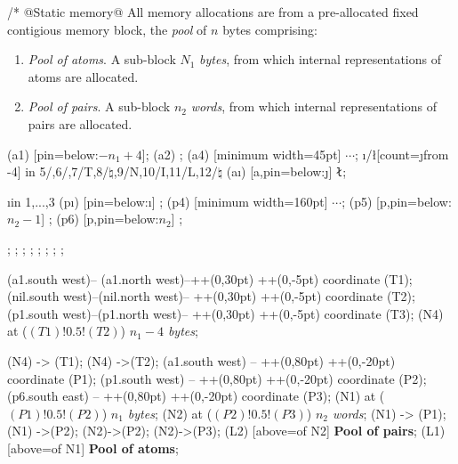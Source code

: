 \documentclass[12pt]{article}
\newenvironment{layout}{\quote\tikzpicture[start chain=going right,x=13pt,y=13pt]\scriptsize}
                       {\endtikzpicture\endquote}
\begin{document}
\begin{code}[literate=
    {*}{$\times$}{1}
    {=}{$\equiv$ }{1}{*}{$\times$}{1}
    {1<<13}{$2^{13}$}{3}
    {1<<15}{$2^{15}$}{3}
    {1a<<$H_x$}{$2^{H_x}$}{3}
]/* @Static memory@ 
All memory allocations are from a pre-allocated fixed 
contigious memory block, the \emph{pool} of $n$ bytes comprising:
\begin{enumerate} 
\item \emph{Pool of atoms}. A sub-block $N_1$ \emph{bytes}, from which 
internal representations of atoms are allocated. 
\item \emph{Pool of pairs}. A sub-block $n_2$ \emph{words},
from which internal representations of pairs are allocated. 
\end{enumerate}

\begin{layout}
\node[a] (a1) [pin=below:$-n_1+4$]{};
\node[a] (a2) {};
\node[a] (a4) [minimum width=45pt] {$\cdots$};
\foreach \i/\l[count=\j from -4] in {5/,6/,7/T,8/$\natural$,9/N,10/I,11/L,12/$\natural$} \node (a\i) [a,pin=below:{\j}] {\tt\l};

\foreach \i in {1,...,3} \node[p] (p\i) [pin=below:{\i}] {};
\node[p] (p4) [minimum width=160pt] {$\cdots$};
\node[p] (p5) [p,pin=below:{$n_2-1$}] {};
\node[p] (p6) [p,pin=below:{$n_2$}] {};

;
;
\node[p,draw,fill=olive!30,above=of p1,pin=above:1] {};
\node[p,draw,fill=olive!30,above=of p2,pin=above:2] {};
\node[p,draw,fill=olive!30,above=of p3,pin=above:2] {};
\node[p,draw,fill=olive!30,above=of p4,minimum width=160pt] {};
\node[p,draw,fill=olive!30,above=of p5,pin=above:$n_2-1$] {};
\node[p,draw,fill=olive!30,above=of p6,pin=above:$n_2$] {};

 (a1.south west)-- (a1.north west)--++(0,30pt) ++(0,-5pt) coordinate (T1);
 (nil.south west)--(nil.north west)-- ++(0,30pt) ++(0,-5pt) coordinate (T2);
 (p1.south west)--(p1.north west)-- ++(0,30pt) ++(0,-5pt) coordinate (T3);
\node (N4) at ($(T1)!0.5!(T2)$) {\it$n_1-4$ bytes};

\draw[m] (N4) -> (T1);
\draw[m] (N4) ->(T2);
 (a1.south west) -- ++(0,80pt) ++(0,-20pt) coordinate (P1);
 (p1.south west) -- ++(0,80pt) ++(0,-20pt) coordinate (P2);
 (p6.south east) -- ++(0,80pt) ++(0,-20pt) coordinate (P3);
\node (N1) at ($(P1)!0.5!(P2)$) {\it$n_1$ bytes};
\node (N2) at ($(P2)!0.5!(P3)$) {\it$n_2$ words};
\draw[m] (N1) -> (P1);
\draw[m] (N1) ->(P2);
\draw[m] (N2)->(P2);
\draw[m] (N2)->(P3); 
\node(L2) [above=of N2]  {\bf Pool of pairs}; 
\node(L1) [above=of N1]  {\bf Pool of atoms}; 


\end{layout}
\end{code}
\end{document}
